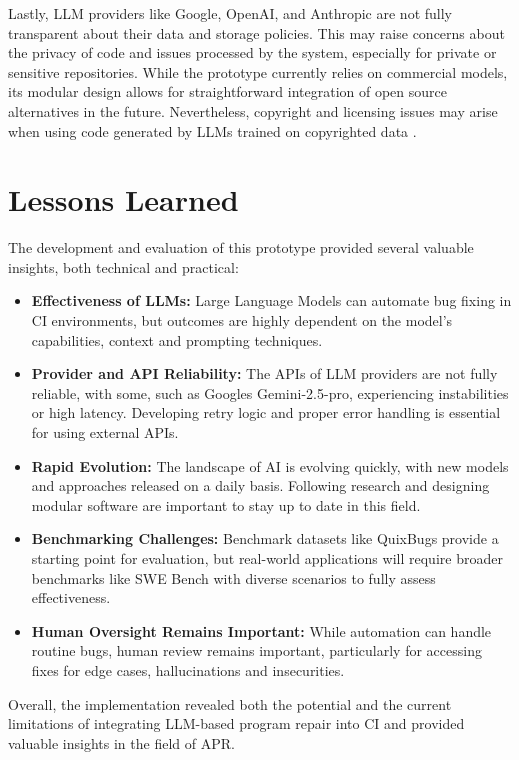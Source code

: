 Lastly, \ac{LLM} providers like Google, OpenAI, and Anthropic are not fully transparent about their data and storage policies. This may raise concerns about the privacy of code and issues processed by the system, especially for private or sensitive repositories. While the prototype currently relies on commercial models, its modular design allows for straightforward integration of open source alternatives in the future. Nevertheless, copyright and licensing issues may arise when using code generated by \acp{LLM} trained on copyrighted data \cite{sauvolaFutureSoftwareDevelopment2024, houLargeLanguageModels2024}.

\section{Lessons Learned}
The development and evaluation of this prototype provided several valuable insights, both technical and practical:

\begin{itemize}
    \item \textbf{Effectiveness of \acp{LLM}:} Large Language Models can automate bug fixing in CI environments, but outcomes are highly dependent on the model's capabilities, context and prompting techniques.
    \item \textbf{Provider and API Reliability:} The APIs of \ac{LLM} providers are not fully reliable, with some, such as Googles Gemini-2.5-pro, experiencing instabilities or high latency. Developing retry logic and proper error handling is essential for using external APIs.
    \item \textbf{Rapid Evolution:} The landscape of AI is evolving quickly, with new models and approaches released on a daily basis. Following research and designing modular software are important to stay up to date in this field.
    \item \textbf{Benchmarking Challenges:} Benchmark datasets like QuixBugs provide a starting point for evaluation, but real-world applications will require broader benchmarks like SWE Bench with diverse scenarios to fully assess effectiveness.
    \item \textbf{Human Oversight Remains Important:} While automation can handle routine bugs, human review remains important, particularly for accessing fixes for edge cases, hallucinations and insecurities.
\end{itemize}

Overall, the implementation revealed both the potential and the current limitations of integrating LLM-based program repair into CI and provided valuable insights in the field of \ac{APR}.


